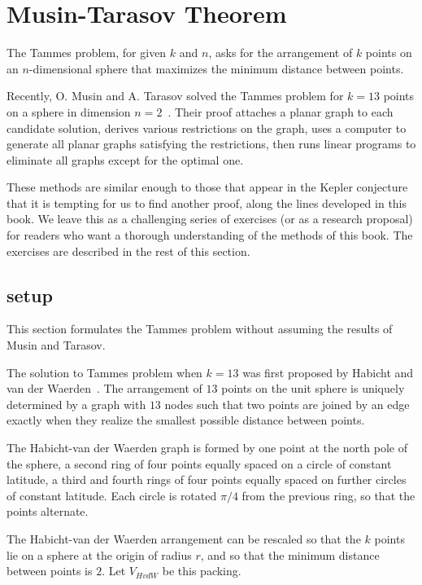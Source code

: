 \section{Musin-Tarasov Theorem}

The Tammes problem, for given $k$ and $n$, asks for the arrangement of
$k$ points on an $n$-dimensional sphere that maximizes the minimum
distance between points.

Recently, O. Musin and A. Tarasov solved the Tammes problem for $k=13$
points on a sphere in dimension $n=2$~\cite{Musin-Tarasov}.  Their
proof attaches a planar graph to each candidate solution, derives
various restrictions on the graph, uses a computer to generate all
planar graphs satisfying the restrictions, then runs linear programs
to eliminate all graphs except for the optimal one.

These methods are similar enough to those that appear in the Kepler
conjecture that it is tempting for us to find another proof, along the
lines developed in this book.  We leave this as a challenging series
of exercises (or as a research proposal) for readers who want a
thorough understanding of the methods of this book.  The exercises are
described in the rest of this section.

\subsection{setup}

This section formulates the Tammes problem without assuming the results
of Musin and Tarasov.

The solution to Tammes problem when $k=13$ was first proposed by
Habicht and van der Waerden~\cite{unknown}.  The arrangement of $13$
points on the unit sphere is uniquely determined by a graph with $13$
nodes such that two points are joined by an edge exactly when they
realize the smallest possible distance between points.

The Habicht-van der Waerden graph is formed by one point at the north
pole of the sphere, a second ring of four points equally spaced on a
circle of constant latitude, a third and fourth rings of four points
equally spaced on further circles of constant latitude.  Each circle
is rotated $\pi/4$ from the previous ring, so that the points
alternate.

The Habicht-van der Waerden arrangement can be rescaled so that the
$k$ points lie on a sphere at the origin of radius $r$, and so that
the minimum distance between points is $2$.  Let $V_{HvdW}$ be this
packing.

